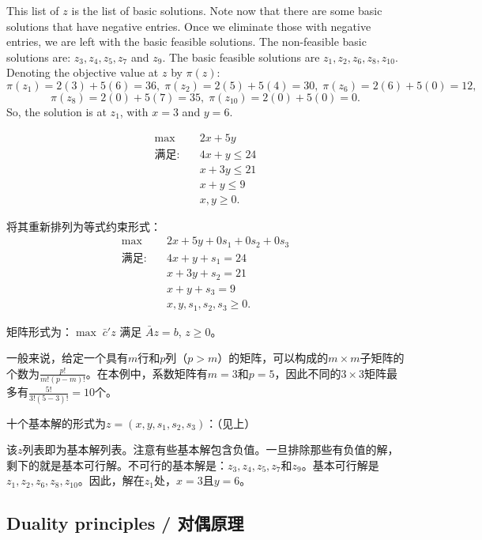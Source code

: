\begin{original}
This list of $z$ is the list of basic solutions. Note now that there are some basic solutions that have negative entries. Once we eliminate those with negative entries, we are left with the basic feasible solutions. The non-feasible basic solutions are: $z_3, z_4, z_5, z_7$ and $z_9$. The basic feasible solutions are $z_1, z_2, z_6, z_8, z_{10}$. Denoting the objective value at $z$ by $\pi(z)$:
\[
\pi(z_1) = 2(3) + 5(6) = 36,\; \pi(z_2) = 2(5) + 5(4) = 30,\; \pi(z_6) = 2(6) + 5(0) = 12,
\]
\[
\pi(z_8) = 2(0) + 5(7) = 35,\; \pi(z_{10}) = 2(0) + 5(0) = 0.
\]
So, the solution is at $z_1$, with $x = 3$ and $y = 6$.
\end{original}
\begin{translation}
\[
\begin{aligned}
\max \quad & 2x + 5y \\
\text{满足:} \quad & 4x + y \le 24 \\
& x + 3y \le 21 \\
& x + y \le 9 \\
& x, y \ge 0.
\end{aligned}
\]

将其重新排列为等式约束形式：
\[
\begin{aligned}
\max \quad & 2x + 5y + 0s_1 + 0s_2 + 0s_3 \\
\text{满足:} \quad & 4x + y + s_1 = 24 \\
& x + 3y + s_2 = 21 \\
& x + y + s_3 = 9 \\
& x, y, s_1, s_2, s_3 \ge 0.
\end{aligned}
\]

矩阵形式为：$\max \; \bar{c}'z$ 满足 $\bar{A}z = b$, $z \ge 0$。

一般来说，给定一个具有$m$行和$p$列（$p > m$）的矩阵，可以构成的$m \times m$子矩阵的个数为$\frac{p!}{m!(p-m)!}$。在本例中，系数矩阵有$m = 3$和$p = 5$，因此不同的$3 \times 3$矩阵最多有$\frac{5!}{3!(5-3)!} = 10$个。

十个基本解的形式为$z = (x, y, s_1, s_2, s_3)$：（见上）

该$z$列表即为基本解列表。注意有些基本解包含负值。一旦排除那些有负值的解，剩下的就是基本可行解。不可行的基本解是：$z_3, z_4, z_5, z_7$和$z_9$。基本可行解是$z_1, z_2, z_6, z_8, z_{10}$。因此，解在$z_1$处，$x = 3$且$y = 6$。
\end{translation}

\subsection{Duality principles / 对偶原理}

